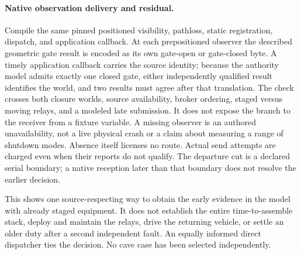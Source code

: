 \documentclass{article}
\begin{document}
\paragraph{Native observation delivery and residual.}
Compile the same pinned positioned visibility, pathloss, static
registration, dispatch, and application callback. At each
prepositioned observer the described geometric gate result is
encoded as its own gate-open or gate-closed byte. A timely
application callback carries the source identity; because the
authority model admits exactly one closed gate, either
independently qualified result identifies the world, and two
results must agree after that translation.
The check crosses both closure worlds, source availability,
broker ordering, staged versus moving relays, and a modeled
late submission. It does not expose the branch to the receiver
from a fixture variable. A missing observer is an authored
unavailability, not a live physical crash or a claim about
measuring a range of shutdown modes. Absence itself licenses
no route. Actual send attempts are charged even when their
reports do not qualify. The departure cut is a declared
serial boundary; a native reception later than that boundary
does not resolve the earlier decision.

This shows one source-respecting way to obtain the early evidence
in the model with already staged equipment. It does not establish
the entire time-to-assemble stack, deploy and maintain the relays,
drive the returning vehicle, or settle an older duty after a
second independent fault. An equally informed direct dispatcher
ties the decision. No cave case has been selected independently.
\end{document}
